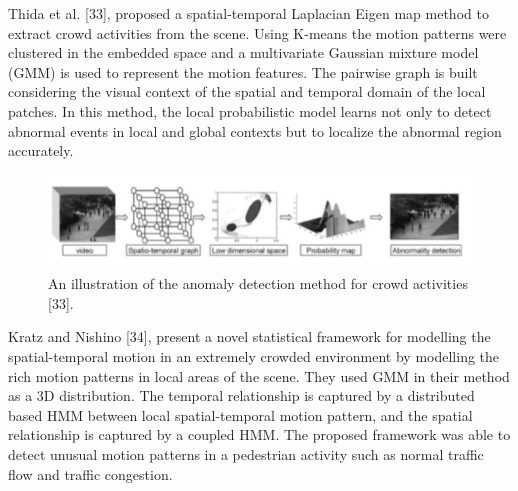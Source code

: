 Thida et al. [33], proposed a spatial-temporal Laplacian Eigen map method to extract crowd activities from the scene. Using K-means the motion patterns were clustered in the embedded space and a multivariate Gaussian mixture model (GMM) is used to represent the motion features. The pairwise graph is built considering the visual context of the spatial and temporal domain of the local patches. In this method, the local probabilistic model learns not only to detect abnormal events in local and global contexts but to localize the abnormal region accurately.
\begin{figure}[ht]
\centering
\includegraphics{Figures/add}
\decoRule
\caption[An illustration of the anomaly detection method for crowd activities "33".]{An illustration of the anomaly detection method for crowd activities [33].}
\label{fig:la}
\end{figure}
\newpage
Kratz and Nishino [34], present a novel statistical framework for modelling the spatial-temporal motion in an extremely crowded environment by modelling the rich motion patterns in local areas of the scene. They used GMM in their method as a 3D distribution. The temporal relationship is captured by a distributed based HMM between local spatial-temporal motion pattern, and the spatial relationship is captured by a coupled HMM. The proposed framework was able to detect unusual motion patterns in a pedestrian activity such as normal traffic flow and traffic congestion.\\

